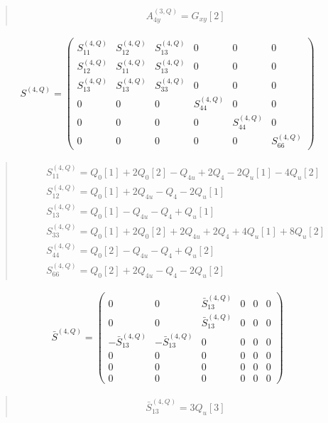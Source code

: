 \documentclass[fleqn,10pt]{jsarticle}
\begin{document}
\begin{quote}
\begin{align*}
& A^{(3,Q)}_{4y} = G_{xy}[2]
\end{align*}
\end{quote}
\begin{align*}
S^{(4,Q)} = \begin{pmatrix} S^{(4,Q)}_{11} & S^{(4,Q)}_{12} & S^{(4,Q)}_{13} & 0 & 0 & 0 \\ S^{(4,Q)}_{12} & S^{(4,Q)}_{11} & S^{(4,Q)}_{13} & 0 & 0 & 0 \\ S^{(4,Q)}_{13} & S^{(4,Q)}_{13} & S^{(4,Q)}_{33} & 0 & 0 & 0 \\ 0 & 0 & 0 & S^{(4,Q)}_{44} & 0 & 0 \\ 0 & 0 & 0 & 0 & S^{(4,Q)}_{44} & 0 \\ 0 & 0 & 0 & 0 & 0 & S^{(4,Q)}_{66} \end{pmatrix}
\end{align*}
\begin{quote}
\begin{align*}
& S^{(4,Q)}_{11} = Q_{0}[1] + 2 Q_{0}[2] - Q_{4u} + 2 Q_{4} - 2 Q_{u}[1] - 4 Q_{u}[2] \\
& S^{(4,Q)}_{12} = Q_{0}[1] + 2 Q_{4u} - Q_{4} - 2 Q_{u}[1] \\
& S^{(4,Q)}_{13} = Q_{0}[1] - Q_{4u} - Q_{4} + Q_{u}[1] \\
& S^{(4,Q)}_{33} = Q_{0}[1] + 2 Q_{0}[2] + 2 Q_{4u} + 2 Q_{4} + 4 Q_{u}[1] + 8 Q_{u}[2] \\
& S^{(4,Q)}_{44} = Q_{0}[2] - Q_{4u} - Q_{4} + Q_{u}[2] \\
& S^{(4,Q)}_{66} = Q_{0}[2] + 2 Q_{4u} - Q_{4} - 2 Q_{u}[2]
\end{align*}
\end{quote}
\begin{align*}
\bar{S}^{(4,Q)} = \begin{pmatrix} 0 & 0 & \bar{S}^{(4,Q)}_{13} & 0 & 0 & 0 \\ 0 & 0 & \bar{S}^{(4,Q)}_{13} & 0 & 0 & 0 \\ - \bar{S}^{(4,Q)}_{13} & - \bar{S}^{(4,Q)}_{13} & 0 & 0 & 0 & 0 \\ 0 & 0 & 0 & 0 & 0 & 0 \\ 0 & 0 & 0 & 0 & 0 & 0 \\ 0 & 0 & 0 & 0 & 0 & 0 \end{pmatrix}
\end{align*}
\begin{quote}
\begin{align*}
& \bar{S}^{(4,Q)}_{13} = 3 Q_{u}[3]
\end{align*}
\end{quote}
\end{document}
